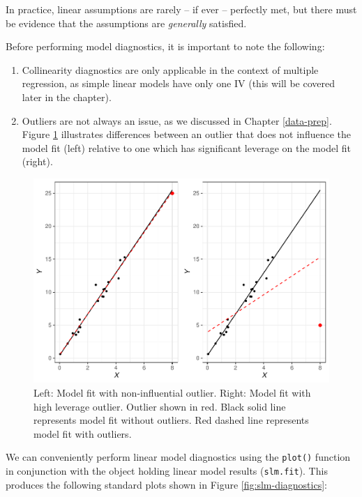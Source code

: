 \documentclass[
]{book}
\providecommand{\tightlist}{%
  \setlength{\itemsep}{0pt}\setlength{\parskip}{0pt}}
\begin{document}
In practice, linear assumptions are rarely -- if ever -- perfectly met, but there must be evidence that the assumptions are \emph{generally} satisfied.

Before performing model diagnostics, it is important to note the following:

\begin{enumerate}
\def\labelenumi{\arabic{enumi}.}
\tightlist
\item
  Collinearity diagnostics are only applicable in the context of multiple regression, as simple linear models have only one IV (this will be covered later in the chapter).
\item
  Outliers are not always an issue, as we discussed in Chapter \ref{data-prep}. Figure \ref{fig:high-leverage} illustrates differences between an outlier that does not influence the model fit (left) relative to one which has significant leverage on the model fit (right).
\end{enumerate}

\begin{figure}

{\centering \includegraphics[width=1\linewidth]{The_Fundamentals_of_People_Analytics_files/figure-latex/high-leverage-1} 

}

\caption{Left: Model fit with non-influential outlier. Right: Model fit with high leverage outlier. Outlier shown in red. Black solid line represents model fit without outliers. Red dashed line represents model fit with outliers.}\label{fig:high-leverage}
\end{figure}

We can conveniently perform linear model diagnostics using the \texttt{plot()} function in conjunction with the object holding linear model results (\texttt{slm.fit}). This produces the following standard plots shown in Figure \ref{fig:slm-diagnostics}:
\end{document}
